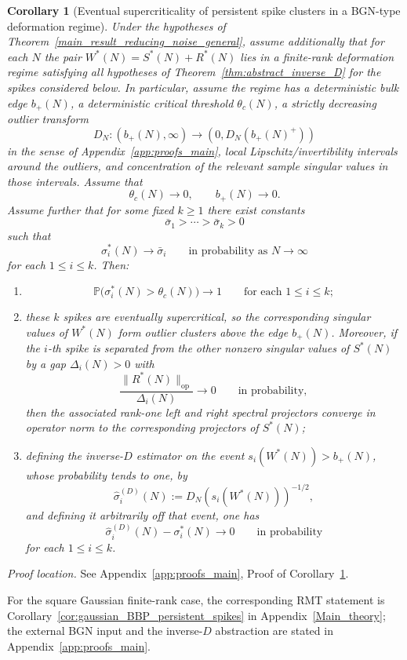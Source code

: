 \documentclass[11pt]{article}
\theoremstyle{plain}
\newtheorem{cor}[thm]{Corollary}
\theoremstyle{definition}
\theoremstyle{remark}
\newcommand{\PP}{\mathbb{P}}
\newcommand{\op}{\mathrm{op}}
\newcommand{\1}{\mathbf{1}}
\newcommand{\proofloc}[1]{\par\noindent\emph{Proof location.} #1\par}
\begin{document}
\begin{cor}[Eventual supercriticality of persistent spike clusters in a BGN-type deformation regime]
\label{cor:general_BGN_persistent_spikes}
Under the hypotheses of Theorem~\ref{main_result_reducing_noise_general}, assume additionally that for each \(N\) the pair \(W^*(N)=S^*(N)+R^*(N)\) lies in a finite-rank deformation regime satisfying all hypotheses of Theorem~\ref{thm:abstract_inverse_D} for the spikes considered below. In particular, assume the regime has a deterministic bulk edge \(b_+(N)\), a deterministic critical threshold \(\theta_c(N)\), a strictly decreasing outlier transform
\[
D_N:(b_+(N),\infty)\to (0,D_N(b_+(N)^+))
\]
in the sense of Appendix~\ref{app:proofs_main}, local Lipschitz/invertibility intervals around the outliers, and concentration of the relevant sample singular values in those intervals. Assume that
\[
\theta_c(N)\to0,
\qquad
b_+(N)\to0.
\]
Assume further that for some fixed \(k\ge1\) there exist constants
\[
\bar\sigma_1>\cdots>\bar\sigma_k>0
\]
such that
\[
\sigma_i^*(N)\to\bar\sigma_i
\qquad\text{in probability as }N\to\infty
\]
for each \(1\le i\le k\). Then:
\begin{enumerate}[leftmargin=2em]
\item
\[
\PP\!\big(\sigma_i^*(N)>\theta_c(N)\big)\to1
\qquad\text{for each }1\le i\le k;
\]
\item these \(k\) spikes are eventually supercritical, so the corresponding singular values of \(W^*(N)\) form outlier clusters above the edge \(b_+(N)\). Moreover, if the \(i\)-th spike is separated from the other nonzero singular values of \(S^*(N)\) by a gap \(\Delta_i(N)>0\) with
\[
\frac{\|R^*(N)\|_{\op}}{\Delta_i(N)}\to0
\qquad\text{in probability},
\]
then the associated rank-one left and right spectral projectors converge in operator norm to the corresponding projectors of \(S^*(N)\);
\item defining the inverse-\(D\) estimator on the event \(s_i(W^*(N))>b_+(N)\), whose probability tends to one, by
\[
\widehat\sigma_i^{(D)}(N):=D_N(s_i(W^*(N)))^{-1/2},
\]
and defining it arbitrarily off that event,
one has
\[
\widehat\sigma_i^{(D)}(N)-\sigma_i^*(N)\to0
\qquad\text{in probability}
\]
for each \(1\le i\le k\).
\end{enumerate}
\end{cor}
\proofloc{See Appendix~\ref{app:proofs_main}, Proof of Corollary~\ref{cor:general_BGN_persistent_spikes}.}

For the square Gaussian finite-rank case, the corresponding RMT statement is Corollary~\ref{cor:gaussian_BBP_persistent_spikes} in Appendix~\ref{Main_theory}; the external BGN input and the inverse-\(D\) abstraction are stated in Appendix~\ref{app:proofs_main}.
\end{document}
